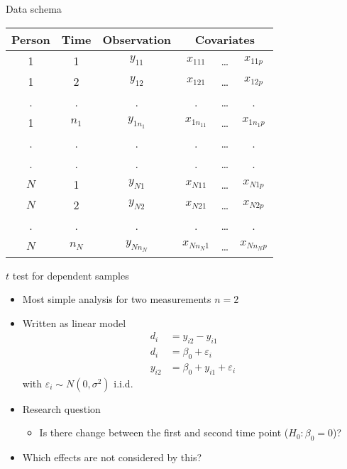 \documentclass{beamer}
\begin{document}
\begin{frame}{Data schema}
\vfill
\begin{center}
\begin{tabular}{cccccc}
\hline
Person & Time      & Observation & \multicolumn{3}{c}{Covariates}\\\hline
1      & 1         & $y_{11}$    & $x_{111}$   & \dots & $x_{11p}$  \\
1      & 2         & $y_{12}$    & $x_{121}$   & \dots & $x_{12p}$  \\
.      & .         & .           & .           & \dots & .          \\
1      & $n_1$     & $y_{1n_1}$  & $x_{1n_11}$ & \dots & $x_{1n_1p}$\\
.      & .         & .           & .           & \dots & .          \\
.      & .         & .           & .           & \dots & .          \\
$N$    & 1         & $y_{N1}$    & $x_{N11}$   & \dots & $x_{N1p}$  \\
$N$    & 2         & $y_{N2}$    & $x_{N21}$   & \dots & $x_{N2p}$  \\
.      & .         & .           & .           & \dots & .          \\
$N$    & $n_N$     & $y_{Nn_N}$  & $x_{Nn_N1}$ & \dots & $x_{Nn_Np}$\\
\hline
\end{tabular}
\end{center}
\vfill
\end{frame}

\begin{frame}{$t$ test for dependent samples}
\begin{itemize}
  \item Most simple analysis for two measurements $n = 2$
  \item Written as linear model
    \begin{align*}
         d_i &= y_{i2} - y_{i1} \\
         d_i &= \beta_0 + \varepsilon_i \\
      y_{i2} &= \beta_0 + y_{i1} + \varepsilon_i
    \end{align*}
    with $\varepsilon_i \sim N(0, \sigma^2)$ i.i.d.
  \item Research question
  \begin{itemize}
    \item Is there change between the first and second time point ($H_0\colon \beta_0 = 0$)?
  \end{itemize}
  \item Which effects are not considered by this?
\end{itemize}
\end{frame}
\end{document}
